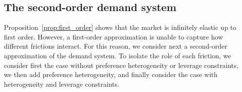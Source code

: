 

\subsection{The second-order demand system}

Proposition~\ref{prop:first_order} shows that the market is infinitely elastic up to first order. 
However, a first-order approximation is unable to capture how different frictions interact. 
For this reason, we consider next a second-order approximation of the demand system. 
To isolate the role of each friction, we consider first the case without preference heterogeneity or leverage constraints, we then add preference heterogeneity, and finally consider the case with heterogeneity and leverage constraints.

